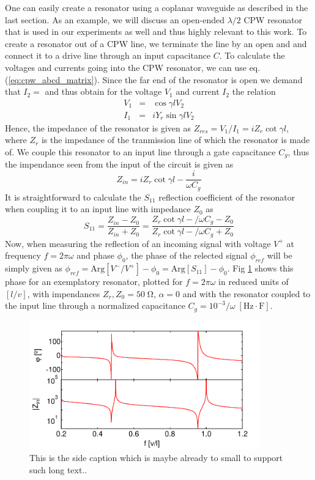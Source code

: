 One can easily create a resonator using a coplanar waveguide as described in the last section. As an example, we will discuss an open-ended $\lambda / 2$ CPW resonator that is used in our experiments as well and thus highly relevant to this work. To create a resonator out of a CPW line, we terminate the line by an open and and connect it to a drive line through an input capacitance $C$. To calculate the voltages and currents going into the CPW resonator, we can use eq. (\ref{eq:cpw_abcd_matrix}). Since the far end of the resonator is open we demand that $I_2=$ and thus obtain for the voltage $V_1$ and current $I_2$ the relation
%
\begin{eqnarray}
V_1 & = & \cos{\gamma l} V_2 \\
I_1 & = & i Y_r \sin{\gamma l} V_2
\end{eqnarray}
%
Hence, the impedance of the resonator is given as $Z_{res} = V_1/I_1 = i Z_r \cot{\gamma l}$, where $Z_r$ is the impedance of the tranmission line of which the resonator is made of. We couple this resonator to an input line through a gate capacitance $C_g$, thus the impendance seen from the input of the circuit is given as
%
\begin{equation}
Z_{in} = i Z_r \cot{\gamma l}-\frac{i}{\omega C_g} \label{eq:cpw_impedance}
\end{equation}
%
It is straightforward to calculate the $S_{11}$ reflection coefficient of the resonator when coupling it to an input line with impedance $Z_0$ as
%
\begin{equation}
S_{11} = \frac{Z_{in}-Z_0}{Z_{in}+Z_0} = \frac{Z_r\cot{\gamma l}-/\omega C_g-Z_0}{Z_r\cot{\gamma l}-/\omega C_g + Z_0}
\end{equation}
%
Now, when measuring the reflection of an incoming signal with voltage $V^+$ at frequency $f=2\pi \omega$ and phase $\phi_0$, the phase of the relected signal $\phi_{ref}$ will be simply given as $\phi_{ref}=\mathrm{Arg}[V^-/V^+]-\phi_0 = \mathrm{Arg}[S_{11}]-\phi_0$. Fig \ref{fig:lambda_over_4_response} shows this phase for an exemplatory resonator, plotted for $f=2\pi\omega$ in reduced units of $[l/v]$, with impendances $Z_r,Z_0=50\;\mathrm{\Omega}$, $\alpha=0$ and with the resonator coupled to the input line through a normalized capacitance $C_g=10^{-3}/\omega\;[\mathrm{Hz}\cdot \mathrm{F}]$.

\begin{figure}
	\includegraphics[width=10cm]{"./material/mathematica/cpw_lambda_over_4_phase_and_z"}
	\caption{This is the side caption which is maybe already to small to support such long text..}
	\label{fig:lambda_over_4_response}
\end{figure}

